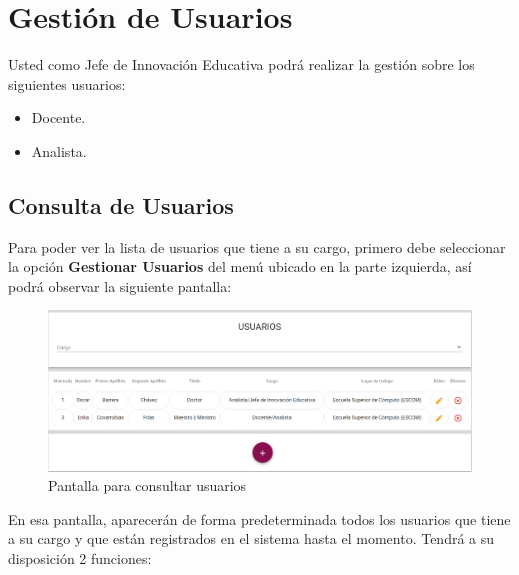 \clearpage
\section{Gestión de Usuarios}

    Usted como Jefe de Innovación Educativa podrá realizar la gestión sobre los siguientes usuarios:
    \begin{itemize}
        \item Docente.
        \item Analista.
    \end{itemize}
  \subsection{Consulta de Usuarios}

Para poder ver la lista de usuarios que tiene a su cargo, primero debe seleccionar la opción \textbf{Gestionar Usuarios} del menú ubicado en la parte izquierda, así podrá observar la siguiente pantalla:

\begin{figure}[H]
	\centering
	\hypertarget{consultarUs}{\includegraphics[width=0.6\linewidth]{images/SP5/Consultar-Usuario}}
	\caption{Pantalla para consultar usuarios}
	\label{consultarrh}
\end{figure}

En esa pantalla, aparecerán de forma predeterminada todos los usuarios que tiene a su cargo y que están registrados en el sistema hasta el momento. Tendrá a su disposición 2 funciones:

